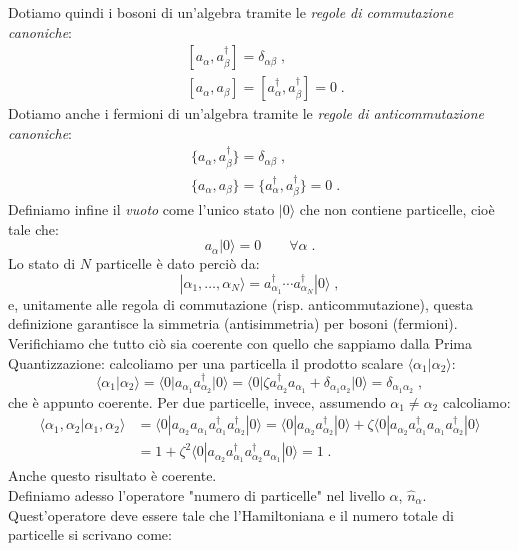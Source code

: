 \documentclass[10pt,a4paper]{report}
\theoremstyle{definition}
\numberwithin{equation}{section}
\newcommand{\bra}{\langle}
\newcommand{\ket}{\rangle}
\begin{document}
Dotiamo quindi i bosoni di un'algebra tramite le \emph{regole di commutazione canoniche}:
\begin{align}
&[a_{\alpha},a_{\beta}^{\dagger}]=\delta_{\alpha\beta}\;, \\
&[a_{\alpha},a_{\beta}]=[a_{\alpha}^{\dagger},a_{\beta}^{\dagger}]=0\;.
\end{align}
Dotiamo anche i fermioni di un'algebra tramite le \emph{regole di anticommutazione canoniche}:
\begin{align}
&\{a_{\alpha},a_{\beta}^{\dagger}\}=\delta_{\alpha\beta} \;,\\
&\{a_{\alpha},a_{\beta}\}=\{a_{\alpha}^{\dagger},a_{\beta}^{\dagger}\}=0\;.
\end{align}
Definiamo infine il \emph{vuoto} come l'unico stato $|0\ket$ che non contiene particelle, cioè tale che:
\begin{equation}
a_{\alpha}|0\ket=0\qquad \forall\alpha\;.
\end{equation}
Lo stato di $N$ particelle è dato perciò da:
\begin{equation}
|\alpha_1,\ldots,\alpha_N\ket=a_{\alpha_1}^{\dagger}\cdots a_{\alpha_N}^{\dagger}|0\ket\;,
\end{equation}
e, unitamente alle regola di commutazione (risp. anticommutazione), questa definizione garantisce la simmetria (antisimmetria) per bosoni (fermioni). \\
Verifichiamo che tutto ciò sia coerente con quello che sappiamo dalla Prima Quantizzazione: calcoliamo per una particella il prodotto scalare $\bra \alpha_1|\alpha_2\ket$:
$$
\bra \alpha_1|\alpha_2\ket=\bra 0|a_{\alpha_1}a_{\alpha_2}^{\dagger}|0\ket=\bra 0|\zeta a_{\alpha_2}^{\dagger}a_{\alpha_1}+\delta_{\alpha_1\alpha_2}|0\ket=\delta_{\alpha_1\alpha_2}\;,
$$
che è appunto coerente. Per due particelle, invece, assumendo $\alpha_1\ne \alpha_2$ calcoliamo:
\begin{align*}
\bra \alpha_1,\alpha_2|\alpha_1,\alpha_2\ket &= \bra 0|a_{\alpha_2}a_{\alpha_1}a_{\alpha_1}^{\dagger}a_{\alpha_2}^{\dagger}|0\ket=\bra 0|a_{\alpha_2}a_{\alpha_2}^{\dagger}|0\ket+\zeta\bra 0|a_{\alpha_2}a_{\alpha_1}^{\dagger}a_{\alpha_1}a_{\alpha_2}^{\dagger}|0\ket \\
&=1+ \zeta^2\bra 0|a_{\alpha_2}a_{\alpha_1}^{\dagger}a_{\alpha_2}^{\dagger}a_{\alpha_1}|0\ket=1\;.
\end{align*}
Anche questo risultato è coerente. \\
Definiamo adesso l'operatore "numero di particelle" nel livello $\alpha$, $\hat{n}_{\alpha}$. Quest'operatore deve essere tale che l'Hamiltoniana e il numero totale di particelle si scrivano come:
\end{document}
